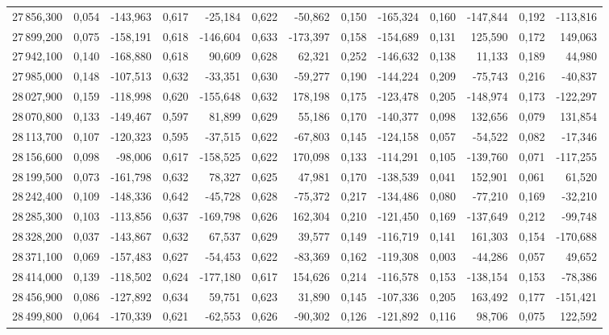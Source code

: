 \begin{longtable}{rrrrrrrrrrrrr}
27\,856,300 & 0,054 & -143,963 & 0,617 & -25,184 & 0,622 & -50,862 & 0,150 & -165,324 & 0,160 & -147,844 & 0,192 & -113,816\\
27\,899,200 & 0,075 & -158,191 & 0,618 & -146,604 & 0,633 & -173,397 & 0,158 & -154,689 & 0,131 & 125,590 & 0,172 & 149,063\\
27\,942,100 & 0,140 & -168,880 & 0,618 & 90,609 & 0,628 & 62,321 & 0,252 & -146,632 & 0,138 & 11,133 & 0,189 & 44,980\\
27\,985,000 & 0,148 & -107,513 & 0,632 & -33,351 & 0,630 & -59,277 & 0,190 & -144,224 & 0,209 & -75,743 & 0,216 & -40,837\\
28\,027,900 & 0,159 & -118,998 & 0,620 & -155,648 & 0,632 & 178,198 & 0,175 & -123,478 & 0,205 & -148,974 & 0,173 & -122,297\\
28\,070,800 & 0,133 & -149,467 & 0,597 & 81,899 & 0,629 & 55,186 & 0,170 & -140,377 & 0,098 & 132,656 & 0,079 & 131,854\\
28\,113,700 & 0,107 & -120,323 & 0,595 & -37,515 & 0,622 & -67,803 & 0,145 & -124,158 & 0,057 & -54,522 & 0,082 & -17,346\\
28\,156,600 & 0,098 & -98,006 & 0,617 & -158,525 & 0,622 & 170,098 & 0,133 & -114,291 & 0,105 & -139,760 & 0,071 & -117,255\\
28\,199,500 & 0,073 & -161,798 & 0,632 & 78,327 & 0,625 & 47,981 & 0,170 & -138,539 & 0,041 & 152,901 & 0,061 & 61,520\\
28\,242,400 & 0,109 & -148,336 & 0,642 & -45,728 & 0,628 & -75,372 & 0,217 & -134,486 & 0,080 & -77,210 & 0,169 & -32,210\\
28\,285,300 & 0,103 & -113,856 & 0,637 & -169,798 & 0,626 & 162,304 & 0,210 & -121,450 & 0,169 & -137,649 & 0,212 & -99,748\\
28\,328,200 & 0,037 & -143,867 & 0,632 & 67,537 & 0,629 & 39,577 & 0,149 & -116,719 & 0,141 & 161,303 & 0,154 & -170,688\\
28\,371,100 & 0,069 & -157,483 & 0,627 & -54,453 & 0,622 & -83,369 & 0,162 & -119,308 & 0,003 & -44,286 & 0,057 & 49,652\\
28\,414,000 & 0,139 & -118,502 & 0,624 & -177,180 & 0,617 & 154,626 & 0,214 & -116,578 & 0,153 & -138,154 & 0,153 & -78,386\\
28\,456,900 & 0,086 & -127,892 & 0,634 & 59,751 & 0,623 & 31,890 & 0,145 & -107,336 & 0,205 & 163,492 & 0,177 & -151,421\\
28\,499,800 & 0,064 & -170,339 & 0,621 & -62,553 & 0,626 & -90,302 & 0,126 & -121,892 & 0,116 & 98,706 & 0,075 & 122,592\\

\end{longtable}
